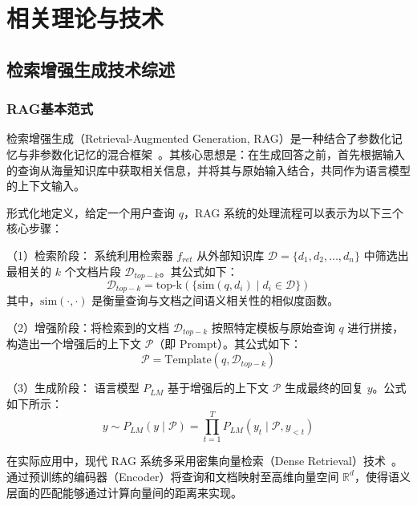 \chapter{相关理论与技术}\label{chap:guide}

\section{检索增强生成技术综述}

\subsection{RAG基本范式}

检索增强生成（Retrieval-Augmented Generation, RAG）是一种结合了参数化记忆与非参数化记忆的混合框架~\citep{lewis2020rag,guu2020realm,gao2024retrievalaugmented}。其核心思想是：在生成回答之前，首先根据输入的查询从海量知识库中获取相关信息，并将其与原始输入结合，共同作为语言模型的上下文输入。

形式化地定义，给定一个用户查询 $q$，RAG 系统的处理流程可以表示为以下三个核心步骤：

（1）检索阶段： 系统利用检索器 $f_{ret}$ 从外部知识库 $\mathcal{D} = \{d_1, d_2, \dots, d_n\}$ 中筛选出最相关的 $k$ 个文档片段 $\mathcal{D}_{top-k}$。其公式如下：
\begin{equation}
    \mathcal{D}_{top-k} = \text{top-k}(\{ \text{sim}(q, d_i) \mid d_i \in \mathcal{D} \})
\end{equation}
其中，$\text{sim}(\cdot, \cdot)$ 是衡量查询与文档之间语义相关性的相似度函数。

（2）增强阶段：将检索到的文档 $\mathcal{D}_{top-k}$ 按照特定模板与原始查询 $q$ 进行拼接，构造出一个增强后的上下文 $\mathcal{P}$（即 Prompt）。其公式如下：
\begin{equation}
    \mathcal{P} = \text{Template}(q, \mathcal{D}_{top-k})
\end{equation}

（3）生成阶段： 语言模型 $P_{LM}$ 基于增强后的上下文 $\mathcal{P}$ 生成最终的回复 $y$。公式如下所示：
\begin{equation}
    y \sim P_{LM}(y \mid \mathcal{P}) = \prod_{t=1}^T P_{LM}(y_t \mid \mathcal{P}, y_{<t})
\end{equation}

在实际应用中，现代 RAG 系统多采用密集向量检索（Dense Retrieval）技术~\citep{karpukhin-etal-2020-dense,izacard2022contriever,xiao2023cpack}。通过预训练的编码器（Encoder）将查询和文档映射至高维向量空间 $\mathbb{R}^d$，使得语义层面的匹配能够通过计算向量间的距离来实现。

